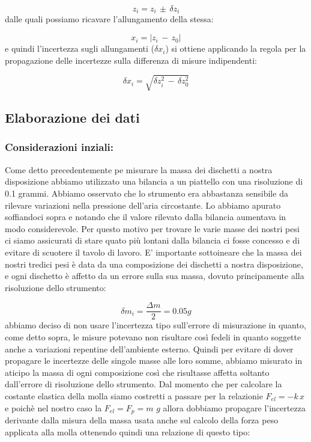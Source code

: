 \begin{equation*}
	z_i = z_i\,\pm\,\delta z_i 
\end{equation*}
dalle quali possiamo ricavare l'allungamento della stessa:

\begin{equation*}
	x_i = |z_i\,-\,z_0|
\end{equation*}
e quindi l’incertezza sugli allungamenti ($\delta x_i$) si ottiene applicando la regola per la propagazione delle incertezze sulla differenza di misure indipendenti:

\begin{equation*}
	\delta x_i = \sqrt{\delta z_i^2\,-\,\delta z_0^2}
\end{equation*}

\subsection{Elaborazione dei dati}

\subsubsection{Considerazioni inziali:}
Come detto precedentemente pe misurare la massa dei dischetti a nostra disposizione abbiamo utilizzato una bilancia a un piattello con una risoluzione di 0.1 grammi. Abbiamo osservato che lo strumento era abbastanza sensibile da rilevare variazioni nella pressione dell'aria circostante. Lo abbiamo apurato soffiandoci sopra e notando che il valore rilevato dalla bilancia aumentava in modo considerevole. Per questo motivo per trovare le varie masse dei nostri pesi ci siamo assicurati di stare quato più lontani dalla bilancia ci fosse concesso e di evitare di scuotere il tavolo di lavoro.
E' importante sottoineare che la massa dei nostri tredici pesi è data da una composizione dei dischetti a nostra disposizione, e ogni dischetto è affetto da un errore sulla sua massa, dovuto principamente alla risoluzione dello strumento:

\begin{equation*}
	\delta m_i = \frac{\Delta m}{2} = 0.05 g 
\end{equation*}
abbiamo deciso di non usare l'incertezza tipo sull'errore di misurazione in quanto, come detto sopra, le misure potevano non risultare così fedeli in quanto soggette anche a variazioni repentine dell'ambiente esterno.
Quindi per evitare di dover propagare le incertezze delle singole masse alle loro somme, abbiamo misurato in aticipo la massa di ogni composizione così che risultasse affetta soltanto dall'errore di risoluzione dello strumento.
Dal momento che per calcolare la costante elastica della molla siamo costretti a passare per la relazionie $F_{el} = -k\,x$ e poichè nel nostro caso la $F_{el} = F_{p} = m\,\,g$ allora dobbiamo propagare l'incertezza derivante dalla misura della massa usata anche sul calcolo della forza peso applicata alla molla ottenendo quindi una relazione di questo tipo:

